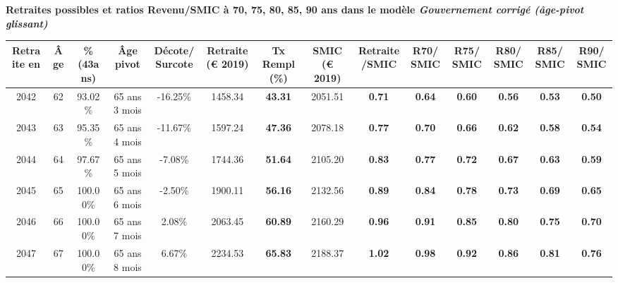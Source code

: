  \vspace{0.1cm} 
{\bf \noindent Retraites possibles et ratios Revenu/SMIC à 70, 75, 80, 85, 90 ans dans le modèle \emph{Gouvernement corrigé (âge-pivot glissant)}}  
 
\begin{adjustbox}{max width=\textwidth} 
\begin{tabular}[htb]{|c|c||c|c|c||c|c||c|c||c|c|c|c|c|} 
\hline 
 Retraite en &  Âge &  \%(43ans) &  Âge pivot &  Décote/Surcote &  Retraite (\euro{} 2019) &  Tx Rempl(\%) &  SMIC (\euro{} 2019) &  Retraite/SMIC &  R70/SMIC &  R75/SMIC &  R80/SMIC &  R85/SMIC &  R90/SMIC \\ 
\hline \hline 
 2042 &  62 &  93.02\% &  65 ans 3 mois &  -16.25\% &  1458.34 &  {\bf 43.31} &  2051.51 &  {\bf {\color{red} 0.71}} &  {\bf {\color{red} 0.64}} &  {\bf {\color{red} 0.60}} &  {\bf {\color{red} 0.56}} &  {\bf {\color{red} 0.53}} &  {\bf {\color{red} 0.50}} \\ 
\hline 
 2043 &  63 &  95.35\% &  65 ans 4 mois &  -11.67\% &  1597.24 &  {\bf 47.36} &  2078.18 &  {\bf {\color{red} 0.77}} &  {\bf {\color{red} 0.70}} &  {\bf {\color{red} 0.66}} &  {\bf {\color{red} 0.62}} &  {\bf {\color{red} 0.58}} &  {\bf {\color{red} 0.54}} \\ 
\hline 
 2044 &  64 &  97.67\% &  65 ans 5 mois &  -7.08\% &  1744.36 &  {\bf 51.64} &  2105.20 &  {\bf {\color{red} 0.83}} &  {\bf {\color{red} 0.77}} &  {\bf {\color{red} 0.72}} &  {\bf {\color{red} 0.67}} &  {\bf {\color{red} 0.63}} &  {\bf {\color{red} 0.59}} \\ 
\hline 
 2045 &  65 &  100.00\% &  65 ans 6 mois &  -2.50\% &  1900.11 &  {\bf 56.16} &  2132.56 &  {\bf {\color{red} 0.89}} &  {\bf {\color{red} 0.84}} &  {\bf {\color{red} 0.78}} &  {\bf {\color{red} 0.73}} &  {\bf {\color{red} 0.69}} &  {\bf {\color{red} 0.65}} \\ 
\hline 
 2046 &  66 &  100.00\% &  65 ans 7 mois &  2.08\% &  2063.45 &  {\bf 60.89} &  2160.29 &  {\bf {\color{red} 0.96}} &  {\bf {\color{red} 0.91}} &  {\bf {\color{red} 0.85}} &  {\bf {\color{red} 0.80}} &  {\bf {\color{red} 0.75}} &  {\bf {\color{red} 0.70}} \\ 
\hline 
 2047 &  67 &  100.00\% &  65 ans 8 mois &  6.67\% &  2234.53 &  {\bf 65.83} &  2188.37 &  {\bf 1.02} &  {\bf {\color{red} 0.98}} &  {\bf {\color{red} 0.92}} &  {\bf {\color{red} 0.86}} &  {\bf {\color{red} 0.81}} &  {\bf {\color{red} 0.76}} \\ 
\hline 
\hline 
\end{tabular} 
\end{adjustbox} 
 

